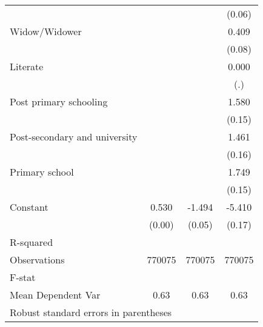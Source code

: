 {\begin{tabular}{l*{3}{c}}
                    &                     &                     &      (0.06)         \\
Widow/Widower       &                     &                     &       0.409\sym{***}\\
                    &                     &                     &      (0.08)         \\
Literate            &                     &                     &       0.000         \\
                    &                     &                     &         (.)         \\
Post primary schooling&                     &                     &       1.580\sym{***}\\
                    &                     &                     &      (0.15)         \\
Post-secondary and university&                     &                     &       1.461\sym{***}\\
                    &                     &                     &      (0.16)         \\
Primary school      &                     &                     &       1.749\sym{***}\\
                    &                     &                     &      (0.15)         \\
Constant            &       0.530\sym{***}&      -1.494\sym{***}&      -5.410\sym{***}\\
                    &      (0.00)         &      (0.05)         &      (0.17)         \\
\hline
R-squared           &                     &                     &                     \\
Observations        &      770075         &      770075         &      770075         \\
F-stat              &                     &                     &                     \\
Mean Dependent Var  &        0.63         &        0.63         &        0.63         \\
\hline\hline
\multicolumn{4}{l}{\footnotesize Robust standard errors in parentheses}\\
\end{tabular}
}
